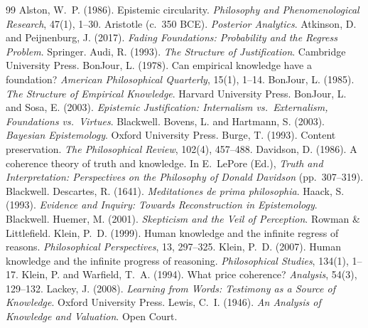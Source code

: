 \documentclass{situationist-preprint}
\begin{document}
\begin{thebibliography}{99}\small
{} Alston, W.~P. (1986). Epistemic circularity. \emph{Philosophy and Phenomenological Research}, 47(1), 1--30.
 Aristotle (c.~350 BCE). \emph{Posterior Analytics}.
 Atkinson, D. and Peijnenburg, J. (2017). \emph{Fading Foundations: Probability and the Regress Problem}. Springer.
 Audi, R. (1993). \emph{The Structure of Justification}. Cambridge University Press.
 BonJour, L. (1978). Can empirical knowledge have a foundation? \emph{American Philosophical Quarterly}, 15(1), 1--14.
 BonJour, L. (1985). \emph{The Structure of Empirical Knowledge}. Harvard University Press.
 BonJour, L. and Sosa, E. (2003). \emph{Epistemic Justification: Internalism vs.\ Externalism, Foundations vs.\ Virtues}. Blackwell.
 Bovens, L. and Hartmann, S. (2003). \emph{Bayesian Epistemology}. Oxford University Press.
 Burge, T. (1993). Content preservation. \emph{The Philosophical Review}, 102(4), 457--488.
 Davidson, D. (1986). A coherence theory of truth and knowledge. In E.~LePore (Ed.), \emph{Truth and Interpretation: Perspectives on the Philosophy of Donald Davidson} (pp.~307--319). Blackwell.
 Descartes, R. (1641). \emph{Meditationes de prima philosophia}.
 Haack, S. (1993). \emph{Evidence and Inquiry: Towards Reconstruction in Epistemology}. Blackwell.
 Huemer, M. (2001). \emph{Skepticism and the Veil of Perception}. Rowman \& Littlefield.
 Klein, P.~D. (1999). Human knowledge and the infinite regress of reasons. \emph{Philosophical Perspectives}, 13, 297--325.
 Klein, P.~D. (2007). Human knowledge and the infinite progress of reasoning. \emph{Philosophical Studies}, 134(1), 1--17.
 Klein, P. and Warfield, T.~A. (1994). What price coherence? \emph{Analysis}, 54(3), 129--132.
 Lackey, J. (2008). \emph{Learning from Words: Testimony as a Source of Knowledge}. Oxford University Press.
 Lewis, C.~I. (1946). \emph{An Analysis of Knowledge and Valuation}. Open Court.

\end{thebibliography}
\end{document}
